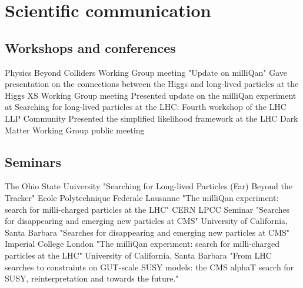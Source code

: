 %

\section{Scientific communication}
\subsection{Workshops and conferences}
 {Physics Beyond Colliders Working Group meeting "Update on milliQan"}
\vspace{0.1cm}
 {Gave presentation on the connections between the Higgs and long-lived particles at the Higgs XS Working Group meeting}
\vspace{0.1cm}
 {Presented update on the milliQan experiment at Searching for long-lived particles at the LHC: Fourth workshop of the LHC LLP Community}
\vspace{0.1cm}
 {Presented the simplified likelihood framework at the LHC Dark Matter Working Group public meeting}
\vspace{0.1cm}
\vspace{0.1cm}
\vspace{0.1cm}
\subsection{Seminars}
 {The Ohio State University "Searching for Long-lived Particles (Far) Beyond the Tracker"}
\vspace{0.1cm}
 {Ecole Polytechnique Federale Lausanne "The milliQan experiment: search for milli-charged particles at the LHC"}
\vspace{0.1cm}
 {CERN LPCC Seminar "Searches for disappearing and emerging new particles at CMS"}
\vspace{0.1cm}
 {University of California, Santa Barbara "Searches for disappearing and emerging new particles at CMS"}
\vspace{0.1cm}
 {Imperial College London "The milliQan experiment: search for milli-charged particles at the LHC"}
\vspace{0.1cm}
 {University of California, Santa Barbara "From LHC searches to constraints on GUT-scale SUSY models: the CMS alphaT search for SUSY, reinterpretation and towards the future."}
\vspace{0.1cm}

